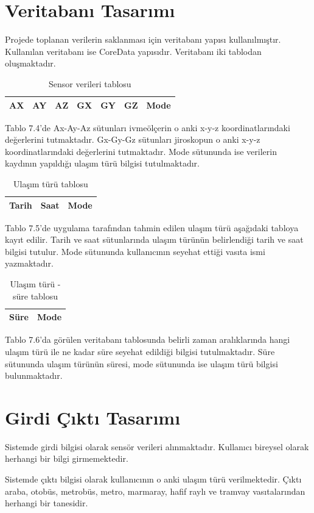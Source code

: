 \section{Veritabanı Tasarımı}
Projede toplanan verilerin saklanması için veritabanı yapısı kullanılmıştır. Kullanılan veritabanı ise CoreData yapısıdır. Veritabanı iki tablodan oluşmaktadır.


\begin{table}[!htbp]
\centering
\caption{Sensor verileri tablosu}
\label{myl}
\begin{tabular}{|l|l|l|l|l|l|l|}
\hline
AX & AY & AZ & GX & GY & GZ & Mode \\ \hline
\end{tabular}
\end{table}

Tablo 7.4'de Ax-Ay-Az sütunları ivmeölçerin o anki x-y-z koordinatlarındaki değerlerini tutmaktadır. Gx-Gy-Gz sütunları jiroskopun o anki x-y-z koordinatlarındaki değerlerini tutmaktadır. Mode sütununda ise verilerin kaydının yapıldığı ulaşım türü bilgisi tutulmaktadır.

\begin{table}[!htbp]
\centering
\caption{Ulaşım türü tablosu}
\begin{tabular}{|l|l|l|}
\hline
Tarih & Saat & Mode \\ \hline
\end{tabular}
\end{table}

Tablo 7.5'de uygulama tarafından tahmin edilen ulaşım türü aşağıdaki tabloya kayıt edilir.
Tarih ve saat sütunlarında ulaşım türünün belirlendiği tarih ve saat bilgisi tutulur. Mode sütununda kullanıcının seyehat ettiği vasıta ismi yazmaktadır.

\begin{table}[!htbp]
\centering
\caption{Ulaşım türü - süre tablosu}
\label{my-label}
\begin{tabular}{|l|l|}
\hline
Süre & Mode \\ \hline
\end{tabular}
\end{table}

Tablo 7.6'da görülen veritabanı tablosunda belirli zaman aralıklarında hangi ulaşım türü ile ne kadar süre seyehat edildiği bilgisi tutulmaktadır. Süre sütununda ulaşım türünün süresi, mode sütununda ise ulaşım türü bilgisi bulunmaktadır.

\section{Girdi Çıktı Tasarımı}
Sistemde girdi bilgisi olarak sensör verileri alınmaktadır. Kullanıcı bireysel olarak herhangi bir bilgi girmemektedir.

Sistemde çıktı bilgisi olarak kullanıcının o anki ulaşım türü verilmektedir. Çıktı araba, otobüs, metrobüs, metro, marmaray, hafif raylı ve tramvay vasıtalarından herhangi bir tanesidir.

